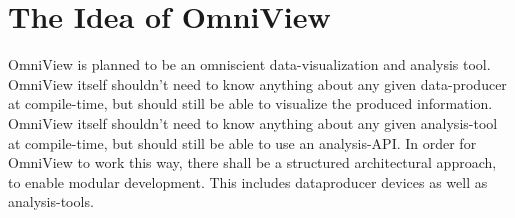 \documentclass{scrreprt}
\begin{document}
\makeglossaries

\tableofcontents
\newpage 

\chapter{The Idea of OmniView}
OmniView is planned to be an omniscient data-visualization and analysis tool. 
OmniView itself shouldn't need to know anything about any given data-producer at compile-time, but should still be able to visualize the produced information.
OmniView itself shouldn't need to know anything about any given analysis-tool at compile-time, but should still be able to use an analysis-API. 
In order for OmniView to work this way, there shall be a structured architectural approach, to enable modular development.
This includes dataproducer devices as well as analysis-tools.
\end{document}
